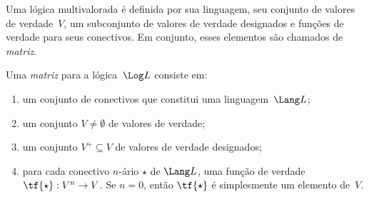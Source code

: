 \documentclass[../../../include/open-logic-section]{subfiles}
\begin{document}


Uma lógica multivalorada é definida por sua linguagem, seu conjunto de valores de
verdade~$V$, um subconjunto de valores de verdade designados e funções de verdade
para seus conectivos. Em conjunto, esses elementos são chamados de \emph{matriz}.  

\begin{defn}[Matriz]
Uma \emph{matriz} para a lógica~$\Log L$ consiste em:
\begin{enumerate}
\item um conjunto de conectivos que constitui uma linguagem~$\Lang L$;
\item um conjunto $V \neq \emptyset$ de valores de verdade;
\item um conjunto $V^+ \subseteq V$ de valores de verdade designados;
\item para cada conectivo $n$-ário $\star$ de $\Lang L$, uma função de
verdade~$\tf{\star} : V^n \to V$. Se $n = 0$, então $\tf{\star}$ é
simplesmente um elemento de~$V$.
\end{enumerate}
\end{defn}
\end{document}
